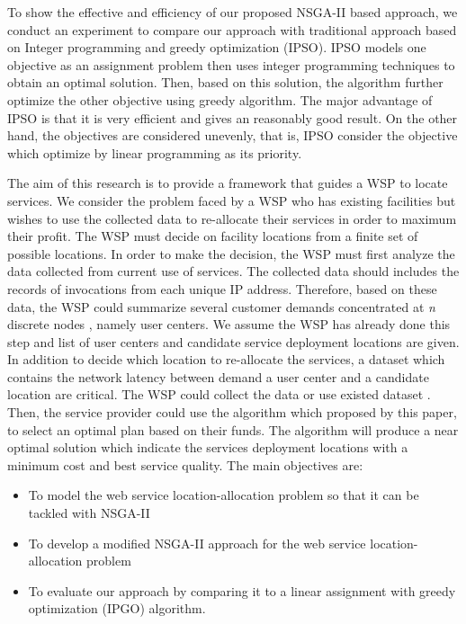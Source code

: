 \documentclass{llncs}
\begin{document}
To show the effective and efficiency of our proposed NSGA-II based approach, we conduct an experiment to compare our approach with
traditional approach based on Integer programming and greedy optimization (IPSO). IPSO models one objective as an assignment problem then uses integer programming techniques to 
obtain an optimal solution. Then, based on this solution, the algorithm further optimize the other objective using greedy algorithm. 
The major advantage of IPSO is that it is very efficient and gives 
an reasonably good result. On the other hand, the objectives are considered unevenly, that is, IPSO consider the objective which optimize by linear programming as its priority.


The aim of this research is to provide a framework that guides a WSP to locate services.
We consider the problem faced by a WSP who has existing facilities but wishes to use the collected data to re-allocate their services in order to maximum their profit.
The WSP must decide on facility locations from a finite set of possible locations. 
In order to make the decision, the WSP must first analyze the data collected from current use of services. 
The collected data should includes the records of invocations from each unique IP address.
Therefore, based on these data, the WSP could summarize several customer demands concentrated at \textit{n} discrete nodes \cite{Aboolian}, namely user centers. 
We assume the WSP has already done this step and list of user centers and candidate service deployment locations are given.
In addition to decide which location to re-allocate the services, a dataset which contains the network latency between demand a user center and a candidate location are critical. 
The WSP could collect the data or use existed dataset  \cite{6076756} \cite{5552800}. 
Then, the service provider could use the algorithm which proposed by this paper, to select an optimal plan based on their funds. 
The algorithm will produce a near optimal solution which indicate the services deployment locations with a minimum cost and best service quality.
The main objectives are:
\begin{itemize}
	\item To model the web service location-allocation problem so that it can be tackled with NSGA-II
	\item To develop a modified NSGA-II approach for the web service location-allocation problem
	\item To evaluate our approach by comparing it to a linear assignment with greedy optimization (IPGO) algorithm.
\end{itemize}
\end{document}
